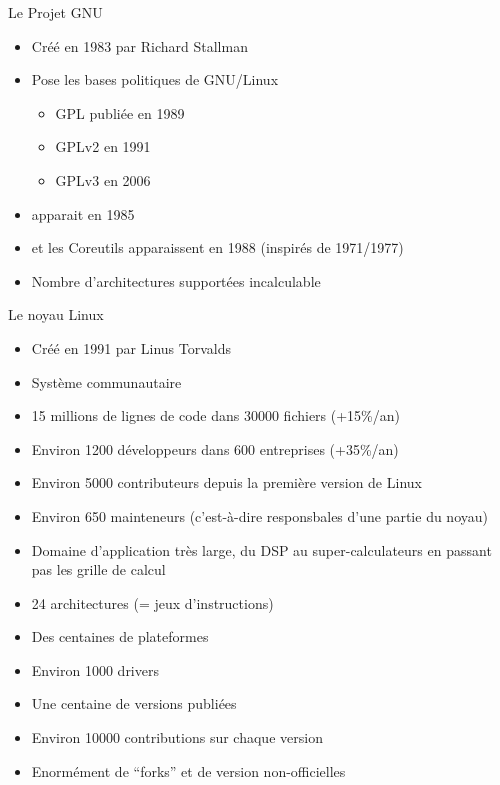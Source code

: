 \begin{frame}{Le Projet GNU}
  \begin{itemize}
  \item Créé en 1983 par Richard Stallman
  \item Pose  les bases politiques  de GNU/Linux
    \begin{itemize}
    \item GPL publiée en 1989
    \item GPLv2 en 1991
    \item GPLv3 en 2006
    \end{itemize}
  \item {} apparait en 1985
  \item {} et les  Coreutils apparaissent en 1988 (inspirés de
     1971/1977)
  \item Nombre d'architectures supportées incalculable
  \end{itemize}
\end{frame}

\begin{frame}{Le noyau Linux}
  \begin{itemize}
  \item Créé  en 1991 par  Linus Torvalds 
  \item Système communautaire 
  \item 15 millions de lignes de code dans 30000 fichiers (+15\%/an)
  \item Environ 1200 développeurs dans 600 entreprises (+35\%/an)
  \item Environ 5000 contributeurs depuis la première version de Linux
  \item  Environ  650  mainteneurs  (c'est-à-dire  responsbales  d'une
    partie du noyau)
  \item Domaine d'application très large, du DSP au super-calculateurs
    en passant pas les grille de calcul
  \item 24 architectures (= jeux d'instructions)
  \item Des centaines de plateformes
  \item Environ 1000 drivers
  \item Une centaine de versions publiées
  \item Environ 10000 contributions sur chaque version
  \item Enormément de ``forks'' et de version non-officielles
  \end{itemize}
\end{frame}

